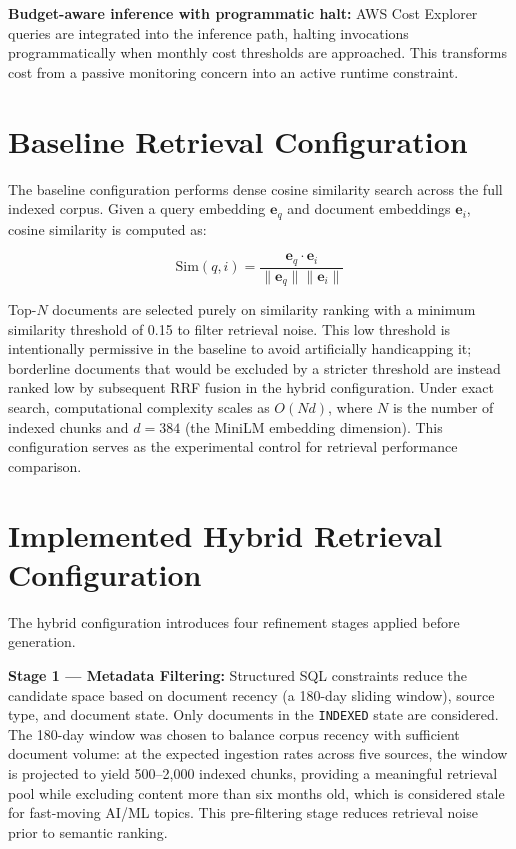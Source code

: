 \textbf{Budget-aware inference with programmatic halt:} AWS Cost Explorer queries are integrated into the inference path, halting invocations programmatically when monthly cost thresholds are approached. This transforms cost from a passive monitoring concern into an active runtime constraint.

\section{Baseline Retrieval Configuration}
\label{sec:baseline}

The baseline configuration performs dense cosine similarity search across the full indexed corpus. Given a query embedding $\mathbf{e}_q$ and document embeddings $\mathbf{e}_i$, cosine similarity is computed as:

\begin{equation}
  \text{Sim}(q, i) = \frac{\mathbf{e}_q \cdot \mathbf{e}_i}{\|\mathbf{e}_q\|\|\mathbf{e}_i\|}
  \label{eq:cosine}
\end{equation}

Top-$N$ documents are selected purely on similarity ranking with a minimum similarity threshold of 0.15 to filter retrieval noise. This low threshold is intentionally permissive in the baseline to avoid artificially handicapping it; borderline documents that would be excluded by a stricter threshold are instead ranked low by subsequent RRF fusion in the hybrid configuration. Under exact search, computational complexity scales as $O(Nd)$, where $N$ is the number of indexed chunks and $d = 384$ (the MiniLM embedding dimension). This configuration serves as the experimental control for retrieval performance comparison.

\section{Implemented Hybrid Retrieval Configuration}
\label{sec:hybrid}

The hybrid configuration introduces four refinement stages applied before generation.

\textbf{Stage 1 --- Metadata Filtering:} Structured SQL constraints reduce the candidate space based on document recency (a 180-day sliding window), source type, and document state. Only documents in the \texttt{INDEXED} state are considered. The 180-day window was chosen to balance corpus recency with sufficient document volume: at the expected ingestion rates across five sources, the window is projected to yield 500--2,000 indexed chunks, providing a meaningful retrieval pool while excluding content more than six months old, which is considered stale for fast-moving AI/ML topics. This pre-filtering stage reduces retrieval noise prior to semantic ranking.

